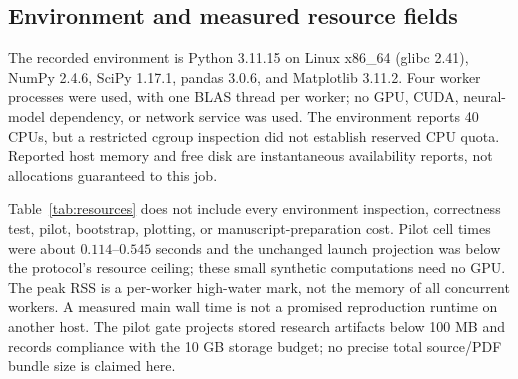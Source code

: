 \documentclass{article}
\theoremstyle{plain}
\begin{document}
\subsection{Environment and measured resource fields}
The recorded environment is Python 3.11.15 on Linux x86\_64 (glibc 2.41), NumPy 2.4.6, SciPy 1.17.1, pandas 3.0.6, and Matplotlib 3.11.2. Four worker processes were used, with one BLAS thread per worker; no GPU, CUDA, neural-model dependency, or network service was used. The environment reports 40 CPUs, but a restricted cgroup inspection did not establish reserved CPU quota. Reported host memory and free disk are instantaneous availability reports, not allocations guaranteed to this job.

\begin{table}[htbp]
\caption{Operational diagnostics from the executed main run. Cell elapsed times and peak worker RSS are not summed CPU-core time or total concurrent memory. ESS is computed from calibration weights, not a substitute rank sample size.}
\label{tab:resources}
\centering

\end{table}

Table~\ref{tab:resources} does not include every environment inspection, correctness test, pilot, bootstrap, plotting, or manuscript-preparation cost. Pilot cell times were about $0.114$--$0.545$ seconds and the unchanged launch projection was below the protocol's resource ceiling; these small synthetic computations need no GPU. The peak RSS is a per-worker high-water mark, not the memory of all concurrent workers. A measured main wall time is not a promised reproduction runtime on another host. The pilot gate projects stored research artifacts below 100 MB and records compliance with the 10 GB storage budget; no precise total source/PDF bundle size is claimed here.
\end{document}
